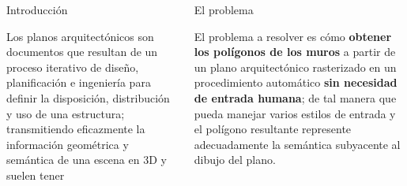 %
%

\begin{frame}[t]
\begin{columns}[t]
\separatorcolumn

\begin{column}{\colwidth}

\begin{block}{Introducción}
		
	Los planos arquitectónicos son documentos que resultan de un proceso iterativo de diseño, planificación e ingeniería para definir la disposición, distribución y uso de una estructura; transmitiendo eficazmente la información geométrica y semántica de una escena en 3D y suelen tener

\end{block}

\end{column}

\separatorcolumn

\begin{column}{\colwidth}

\begin{block}{El problema}
	
	El problema a resolver es cómo \textbf{obtener los polígonos de los muros} a partir de un plano arquitectónico rasterizado en un procedimiento automático \textbf{sin necesidad de entrada humana}; de tal manera que pueda manejar varios estilos de entrada y el polígono resultante represente adecuadamente la semántica subyacente al dibujo del plano.
	
\end{block}
\end{column}

\separatorcolumn
\end{columns}
\end{frame}
